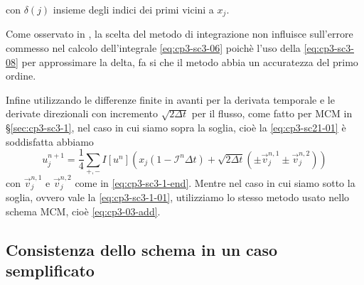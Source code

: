 con $\delta(j)$ insieme degli indici dei  primi vicini a $x_j$.
\begin{osservazione}
Come osservato in \cite[][§1.5]{osher:fed}, la scelta del metodo di
integrazione non influisce sull'errore commesso nel calcolo
dell'integrale \eqref{eq:cp3-sc3-06} poichè l'uso della
\eqref{eq:cp3-sc3-08} per approssimare la delta, fa si che il  metodo
abbia un accuratezza del primo ordine.
\end{osservazione}
Infine utilizzando le differenze finite in avanti per la derivata
temporale e le derivate direzionali con incremento $\sqrt{2\Delta t}$
per il flusso, come fatto per MCM in §\ref{sec:cp3-sc3-1}, nel caso in
cui siamo sopra la soglia, cioè la \eqref{eq:cp3-sc21-01} è soddisfatta abbiamo
\begin{equation}
  \label{eq:cp3-sc3-09}
  u_j^{n+1}=\frac{1}{4}\sum_{+,-}I[u^n]\left(x_j(1-\mathcal{I}^n\Delta
  t)+ \sqrt{2\Delta t}(\pm\vec{v}_j^{n,1}\pm\vec{v}_j^{n,2})\right)
\end{equation}
con $\vec{v}_j^{n,1}$ e $\vec{v}_j^{n,2}$ come in
\eqref{eq:cp3-sc3-1-end}. Mentre nel caso in cui siamo sotto la
soglia, ovvero vale la \eqref{eq:cp3-sc3-1-01}, utilizziamo lo stesso
metodo usato nello schema MCM, cioè \eqref{eq:cp3-03-add}.
%
\subsection{Consistenza dello schema in un caso semplificato}
  \label{subsec:cp3-sc3-3-2}

